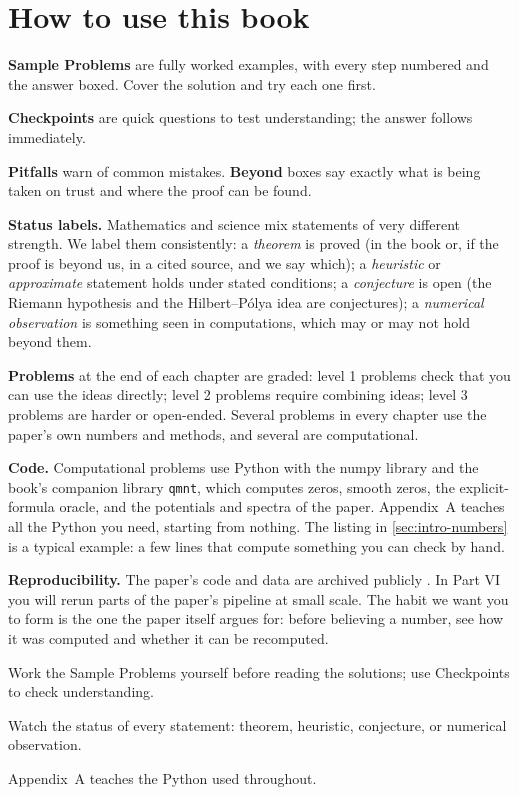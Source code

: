 \section{How to use this book}\label{sec:intro-howto}

\textbf{Sample Problems} are fully worked examples, with every step numbered and the answer boxed. Cover the solution and try each one first.

\textbf{Checkpoints} are quick questions to test understanding; the answer follows immediately.

\textbf{Pitfalls} warn of common mistakes. \textbf{Beyond} boxes say exactly what is being taken on trust and where the proof can be found.

\textbf{Status labels.} Mathematics and science mix statements of very different strength. We label them consistently: a \emph{theorem} is proved (in the book or, if the proof is beyond us, in a cited source, and we say which); a \emph{heuristic} or \emph{approximate} statement holds under stated conditions; a \emph{conjecture} is open (the Riemann hypothesis and the Hilbert--P\'olya idea are conjectures); a \emph{numerical observation} is something seen in computations, which may or may not hold beyond them.

\textbf{Problems} at the end of each chapter are graded: level 1 problems check that you can use the ideas directly; level 2 problems require combining ideas; level 3 problems are harder or open-ended. Several problems in every chapter use the paper's own numbers and methods, and several are computational.

\textbf{Code.} Computational problems use Python with the numpy library and the book's companion library \texttt{qmnt}, which computes zeros, smooth zeros, the explicit-formula oracle, and the potentials and spectra of the paper. Appendix~A teaches all the Python you need, starting from nothing. The listing in \cref{sec:intro-numbers} is a typical example: a few lines that compute something you can check by hand.

\textbf{Reproducibility.} The paper's code and data are archived publicly \cite{zenodo}. In Part VI you will rerun parts of the paper's pipeline at small scale. The habit we want you to form is the one the paper itself argues for: before believing a number, see how it was computed and whether it can be recomputed.

\begin{keyideas}
\item Work the Sample Problems yourself before reading the solutions; use Checkpoints to check understanding.
\item Watch the status of every statement: theorem, heuristic, conjecture, or numerical observation.
\item Appendix~A teaches the Python used throughout.
\end{keyideas}

